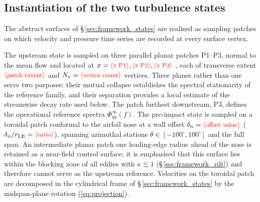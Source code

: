 \documentclass[lineno]{JFM-FLM_Au}
\newcommand{\tbd}[1]{\textcolor{red}{\ensuremath{\langle\mbox{\small #1}\rangle}}}
\begin{document}
\subsection{Instantiation of the two turbulence states}
\label{sec:method_states}

The abstract surfaces of \S\,\ref{sec:framework_states} are realised as
sampling patches on which velocity and pressure time series are recorded
at every surface vertex.

The upstream state is sampled on three parallel planar patches
P1--P3, normal to the mean flow and located at
$x = \tbd{x P1}, \tbd{x P2}, \tbd{x P3}$
, each of transverse extent $\tbd{patch extent}$ and
$N_v = \tbd{vertex count}$ vertices. Three planes rather than one serve
two purposes: their mutual collapse establishes the spectral stationarity
of the reference family, and their separation provides a local estimate
of the streamwise decay rate used below. The patch furthest downstream,
P3, defines the operational reference spectra $\Phi^{\infty}_{qq}(f)$.
The pre-impact state is sampled on a toroidal patch conformal to the
airfoil nose at a wall offset $\delta_n = \tbd{offset value}$
($\delta_n/r_{\mathrm{LE}} = \tbd{ratio}$), spanning azimuthal stations
$\theta \in [-100^\circ, 100^\circ]$
and the full span. An intermediate planar patch one leading-edge radius
ahead of the nose is retained as a near-field control surface; it is
emphasised that this surface lies within the blocking zone of all eddies
with $\kappa \lesssim 1$ (\S\,\ref{sec:framework_rdt}) and therefore
cannot serve as the upstream reference. Velocities on the toroidal patch
are decomposed in the cylindrical frame of
\S\,\ref{sec:framework_states} by the midspan-plane rotation
(\ref{eq:projection}).
\end{document}
